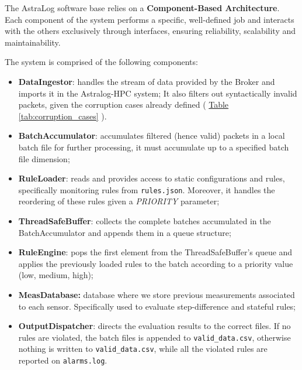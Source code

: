 \documentclass{article}
\newcommand{\tablerefer}[1]{%
    \hyperref[#1_top]{Table \ref*{#1}}%
}
\begin{document}
The AstraLog software base relies on a \textbf{Component-Based Architecture}. Each component of the system performs a specific, well-defined job and interacts with the others exclusively through interfaces, ensuring reliability, scalability and maintainability.

\medskip

The system is comprised of the following components: 
\begin{itemize}
    \item \textbf{DataIngestor}: handles the stream of data provided by the Broker and imports it in the Astralog-HPC system; It also filters out syntactically invalid packets, given the corruption cases already defined (\tablerefer{tab:corruption_cases}).
    \item \textbf{BatchAccumulator}: accumulates filtered (hence valid) packets in a local batch file for further processing, it must accumulate up to a specified batch file dimension;
    \item \textbf{RuleLoader}: reads and provides access to static configurations and rules, specifically monitoring rules from \verb|rules.json|. Moreover, it handles the reordering of these rules given a \textit{PRIORITY} parameter;
    \item \textbf{ThreadSafeBuffer}: collects the complete batches accumulated in the BatchAccumulator and appends them in a queue structure;
    \item \textbf{RuleEngine}: pops the first element from the ThreadSafeBuffer's queue and applies the previously loaded rules to the batch according to a priority value (low, medium, high);
    \item \textbf{MeasDatabase:} database where we store previous measurements associated to each sensor. Specifically used to evaluate step-difference and stateful rules;
    \item \textbf{OutputDispatcher}: directs the evaluation results to the correct files. If no rules are violated, the batch files is appended to \verb|valid_data.csv|, otherwise nothing is written to \verb|valid_data.csv|, while all the violated rules are reported on \verb|alarms.log|.
\end{itemize}
\end{document}
